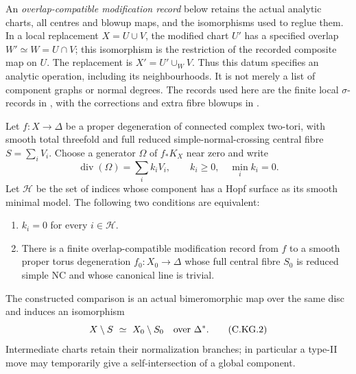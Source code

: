 
An \emph{overlap-compatible modification record} below retains the
actual analytic charts, all centres and blowup maps, and the
isomorphisms used to reglue them. In a local replacement
$X=U\cup V$, the modified chart $U'$ has a specified overlap
$W'\simeq W=U\cap V$; this isomorphism is the restriction of
the recorded composite map on $U$. The replacement is
$X'=U'\cup_W V$. Thus this datum specifies an analytic
operation, including its neighbourhoods. It is not merely a
list of component graphs or normal degrees. The records used
here are the finite local $\sigma$-records in
\cite[\S\S4.2--4.14]{Kulikov1977}, with the corrections and
extra fibre blowups in \cite[\S\S8--11]{Kulikov1981}.

\begin{proposition}\label{cdp:st:C.2.UN.75}
Let $f:X\to\Delta$ be a proper degeneration of connected
complex two-tori, with smooth total threefold and full
reduced simple-normal-crossing central fibre $S=\sum_iV_i$.
Choose a generator $\Omega$ of $f_*K_X$ near zero and write
\[
             \operatorname{div}(\Omega)=\sum_i k_iV_i,
                  \qquad k_i\ge0,\quad \min_i k_i=0.
\tag{C.KG.1}\label{cdp:eq:C.KG.1}
\]
Let $\mathcal H$ be the set of indices whose component has
a Hopf surface as its smooth minimal model. The following
two conditions are equivalent:
\begin{enumerate}
\item $k_i=0$ for every $i\in\mathcal H$.
\item There is a finite overlap-compatible modification
record from $f$ to a smooth proper torus degeneration
$f_0:X_0\to\Delta$ whose full central fibre $S_0$ is
reduced simple NC and whose canonical line is trivial.
\end{enumerate}
The constructed comparison is an actual bimeromorphic map
over the same disc and induces an isomorphism
\[
                X\setminus S\ \simeq\ X_0\setminus S_0
                         \quad\hbox{over }\Delta^*.
\tag{C.KG.2}\label{cdp:eq:C.KG.2}
\]
Intermediate charts retain their normalization branches;
in particular a type-II move may temporarily give a
self-intersection of a global component.


\end{proposition}
